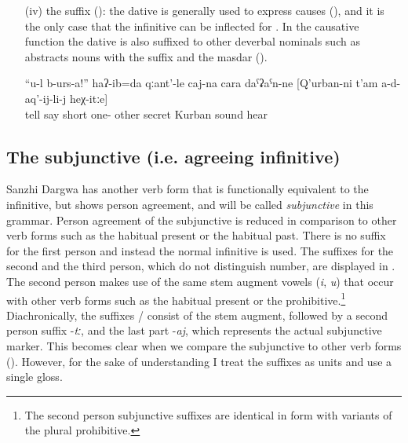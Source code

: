 \begin{enumerate}
	\item[(iv)]	the suffix  (): the dative is generally used to express causes (), and it is the only case that the infinitive can be inflected for . In the causative function the dative is also suffixed to other deverbal nominals such as abstracts nouns with the suffix  and the masdar ().
	\begin{exe}
		\ex	\label{ex:‎‎You tell him, I said silently like this, such that Kurban cannot hear it}
		\gll	``u-l	b-urs-a!''		haʔ-ib=da	qːant'-le	caj-na	cara	daˁʡaˁn-ne		[Q'urban-ni	t'am	a-d-aq'-ij-li-j		heχ-itːe]\\
				tell	say		short	one-	other	secret		Kurban	sound	hear		\\
		\glt	{}
	\end{exe}


\end{enumerate}



\subsection{The subjunctive (i.e. agreeing infinitive)}
\label{ssec:The subjunctive (agreeing infinitive)}

Sanzhi Dargwa has another verb form that is functionally equivalent to the infinitive, but shows person agreement, and will be called \textit{subjunctive} in this grammar. Person agreement of the subjunctive is reduced in comparison to other verb forms such as the habitual present or the habitual past. There is no suffix for the first person and instead the normal infinitive is used. The suffixes for the second and the third person, which do not distinguish number, are displayed in . The second person makes use of the same stem augment vowels (\textit{i}, \textit{u}) that occur with other verb forms such as the habitual present or the prohibitive.\footnote{The second person subjunctive suffixes are identical in form with variants of the plural prohibitive.} Diachronically, the suffixes \slash{} consist of the stem augment, followed by a second person suffix -\textit{tː}, and the last part -\textit{aj}, which represents the actual subjunctive marker. This becomes clear when we compare the subjunctive to other verb forms (). However, for the sake of understanding I treat the suffixes as units and use a single gloss.

